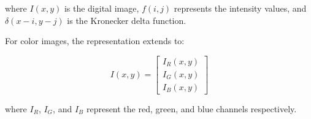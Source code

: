 where $I(x,y)$ is the digital image, $f(i,j)$ represents the
intensity values, and $\delta(x-i, y-j)$ is the Kronecker delta function.

For color images, the representation extends to:

\begin{equation}
  I(x,y) =
  \begin{bmatrix}
    I_R(x,y) \\
    I_G(x,y) \\
    I_B(x,y)
  \end{bmatrix}
\end{equation}

where $I_R$, $I_G$, and $I_B$ represent the red, green, and blue
channels respectively.

